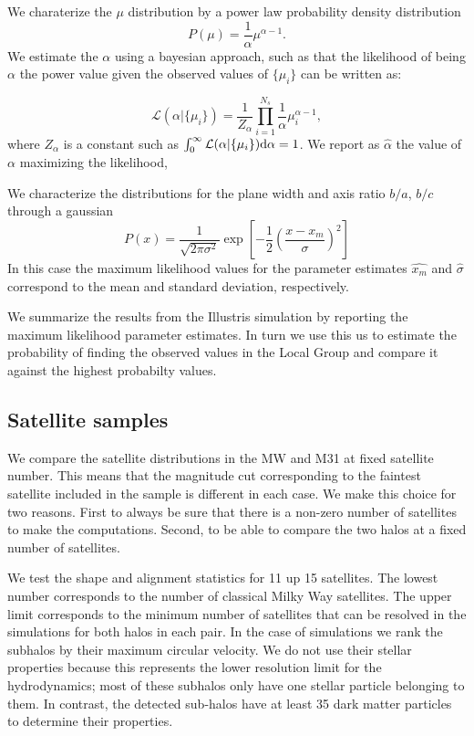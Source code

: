 \documentclass[a4paper,fleqn,usenatbib]{mnras}
\begin{document}
We charaterize the $\mu$ distribution by a power law probability
density distribution
\begin{equation}
P(\mu) = \frac{1}{\alpha}\mu^{\alpha-1}.
\end{equation}
We estimate the $\alpha$ using a bayesian approach, such as that
the likelihood of being $\alpha$ the power value given the observed values of $\{\mu_i\}$
  can be written as:

\begin{equation}
\mathcal{L}(\alpha|\{\mu_i\})=\frac{1}{Z_\alpha}\prod_{i=1}^{N_s}
\frac{1}{\alpha}\mu_i^{\alpha-1}, 
\end{equation}
%
where $Z_{\alpha}$ is a constant such as $\int_{0}^{\infty}
{\mathcal L}(\alpha|\{\mu_i\}) {\rm d}\alpha=1$. 
We report as $\hat{\alpha}$ the value of $\alpha$ 
maximizing the likelihood,

We characterize the distributions for the plane width and axis ratio
$b/a$, $b/c$ through a gaussian
\begin{equation}
P(x)  = \frac{1}{\sqrt{2\pi \sigma^2}} \exp{\left[-\frac{1}{2}\left(\frac{x-x_m}{\sigma}\right)^2\right]}
\end{equation}
In this case the maximum likelihood values for the parameter estimates
$\hat{x_m}$ and $\hat{\sigma}$ correspond to the mean and standard
deviation, respectively.

We summarize the results from the Illustris simulation by reporting
the maximum likelihood parameter estimates. 
In turn we use this us to estimate the probability of finding the
observed values in the Local Group and compare it against the highest
probabilty values.


\subsection{Satellite samples}

We compare the satellite distributions in the MW and M31 at fixed
satellite number.
This means that the magnitude cut corresponding to the faintest
satellite included in the sample is different in each case.
We make this choice for two reasons. 
First to always be sure that there is a non-zero number of satellites to make the computations. 
Second, to be able to compare the two halos at a fixed number of
satellites. 

We test the shape and alignment statistics for 11 up 15 satellites.
The lowest number corresponds to the number of classical Milky Way
satellites.
The upper limit corresponds to the minimum number of satellites that
can be resolved in the simulations for both halos in each pair. 
In the case of simulations we rank the subhalos by their maximum
circular velocity. 
We do not use their stellar properties because this represents the
lower resolution limit for the hydrodynamics; most of these subhalos
only have one stellar particle belonging to them. 
In contrast, the detected sub-halos have at least 35 dark matter
particles to determine their properties.
\end{document}
